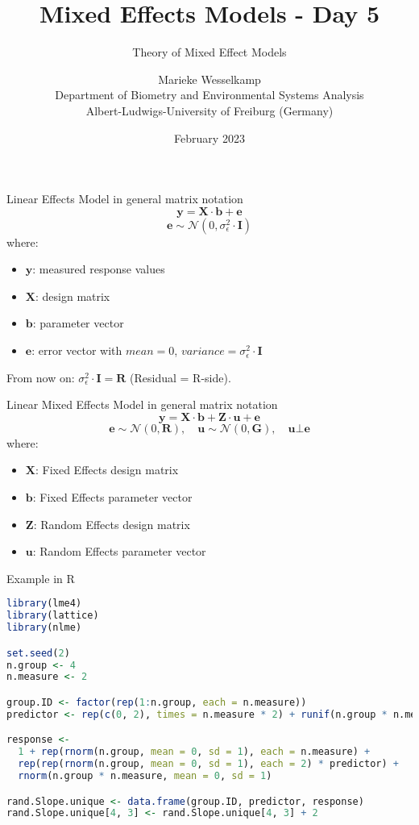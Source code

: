 \documentclass{beamer}
\title{Mixed Effects Models - Day 5}
\subtitle{Theory of Mixed Effect Models}
\author{Marieke Wesselkamp \\ Department of Biometry and Environmental Systems Analysis \\
Albert-Ludwigs-University of Freiburg (Germany)}
\date{February 2023}
\begin{document}
\frame{\titlepage}


\begin{frame}{Linear Effects Model in general matrix notation}
\[
\mathbf{y} = \mathbf{X} \cdot \mathbf{b} + \mathbf{e}
\]
\[
\mathbf{e} \sim \mathcal{N}(0, \sigma^2_{\epsilon} \cdot \mathbf{I})
\]
where:
\begin{itemize}
  \item $\mathbf{y}$: measured response values
  \item $\mathbf{X}$: design matrix
  \item $\mathbf{b}$: parameter vector
  \item $\mathbf{e}$: error vector with $mean = 0$, $variance = \sigma^2_{\epsilon} \cdot \mathbf{I}$
\end{itemize}
\vspace{0.5cm}

From now on: $\sigma^2_{\epsilon} \cdot \mathbf{I} = \mathbf{R}$ (Residual = R-side).
\end{frame}

\begin{frame}{Linear Mixed Effects Model in general matrix notation}
\[
\mathbf{y} = \mathbf{X} \cdot \mathbf{b} + \mathbf{Z} \cdot \mathbf{u} + \mathbf{e}
\]
\[
\mathbf{e} \sim \mathcal{N}(0, \mathbf{R}), \quad \mathbf{u} \sim \mathcal{N}(0, \mathbf{G}), \quad \mathbf{u} \bot \mathbf{e}
\]
where:
\begin{itemize}
  \item $\mathbf{X}$: Fixed Effects design matrix
  \item $\mathbf{b}$: Fixed Effects parameter vector
  \item $\mathbf{Z}$: Random Effects design matrix
  \item $\mathbf{u}$: Random Effects parameter vector
\end{itemize}
\end{frame}

\begin{frame}[fragile]{Example in R}
\begin{lstlisting}[language=R]
library(lme4)
library(lattice)
library(nlme)

set.seed(2)
n.group <- 4
n.measure <- 2

group.ID <- factor(rep(1:n.group, each = n.measure))
predictor <- rep(c(0, 2), times = n.measure * 2) + runif(n.group * n.measure, 0, 3)

response <- 
  1 + rep(rnorm(n.group, mean = 0, sd = 1), each = n.measure) + 
  rep(rep(rnorm(n.group, mean = 0, sd = 1), each = 2) * predictor) + 
  rnorm(n.group * n.measure, mean = 0, sd = 1)

rand.Slope.unique <- data.frame(group.ID, predictor, response)
rand.Slope.unique[4, 3] <- rand.Slope.unique[4, 3] + 2
\end{lstlisting}
\end{frame}
\end{document}
